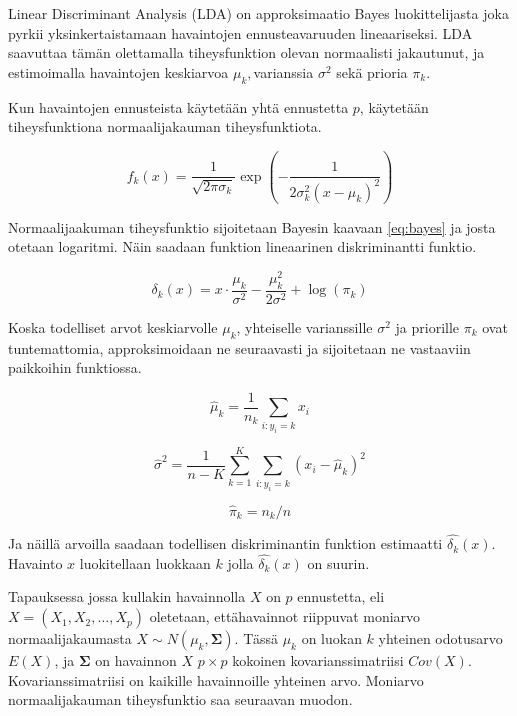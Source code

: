 \documentclass[finnish,twoside,openright]{HYgraduMLDS}
\begin{document}
Linear Discriminant Analysis (LDA) on approksimaatio Bayes luokittelijasta joka pyrkii yksinkertaistamaan havaintojen ennusteavaruuden lineaariseksi. LDA saavuttaa tämän olettamalla tiheysfunktion olevan normaalisti jakautunut, ja estimoimalla havaintojen keskiarvoa $\mu_k, $varianssia $\sigma^2$ sekä prioria $\pi_k$.

Kun havaintojen ennusteista käytetään yhtä ennustetta $p$, käytetään tiheysfunktiona normaalijakauman tiheysfunktiota.

\begin{equation}
    f_k(x) = \frac{1}{\sqrt{2 \pi \sigma_k}} \exp{(-\frac{1}{2 \sigma^2_k (x - \mu_k)^2})}
\end{equation}

Normaalijaakuman tiheysfunktio sijoitetaan Bayesin kaavaan \ref{eq:bayes} ja josta otetaan logaritmi. Näin saadaan funktion lineaarinen diskriminantti funktio.

\begin{equation}
    \delta_k(x) = x \cdot \frac{\mu_k}{\sigma^2} - \frac{\mu^2_k}{2 \sigma^2} + \log(\pi_k)
\end{equation}

Koska todelliset arvot keskiarvolle $\mu_k$, yhteiselle varianssille $\sigma^2$ ja priorille $\pi_k$ ovat tuntemattomia, approksimoidaan ne seuraavasti ja sijoitetaan ne vastaaviin paikkoihin funktiossa.

\begin{equation} \label{eq:estimate-mu}
    \hat{\mu}_k = \frac{1}{n_k} \sum_{i:y_i = k} x_i
\end{equation}

\begin{equation}
    \hat{\sigma}^2 = \frac{1}{n - K} \sum^K_{k=1} \sum_{i:y_i = k} (x_i - \hat{\mu}_k)^2
\end{equation}

\begin{equation} \label{eq:estimate-pi}
    \hat{\pi}_k = n_k / n
\end{equation}

Ja näillä arvoilla saadaan todellisen diskriminantin funktion estimaatti $\hat{\delta_k}(x)$. Havainto $x$ luokitellaan luokkaan $k$ jolla $\hat{\delta_k}(x)$ on suurin.

Tapauksessa jossa kullakin havainnolla $X$ on $p$ ennustetta, eli $X = (X_1, X_2, \dots, X_p)$ oletetaan, ettähavainnot riippuvat moniarvo normaalijakaumasta $X \sim N(\mu_k, \pmb{\Sigma})$. Tässä $\mu_k$ on luokan $k$ yhteinen odotusarvo $E(X)$, ja $\pmb{\Sigma}$ on havainnon $X$ $p \times p$ kokoinen kovarianssimatriisi $Cov(X)$. Kovarianssimatriisi on kaikille havainnoille yhteinen arvo. Moniarvo normaalijakauman tiheysfunktio saa seuraavan muodon.
\end{document}
